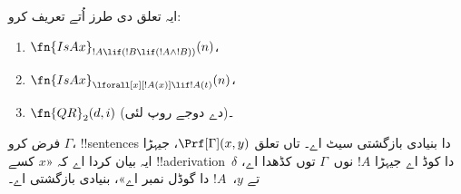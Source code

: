 \documentclass[../../../include/open-logic-section]{subfiles}
\begin{document}
\begin{prob}
ایہ تعلق
دی طرز اُتے
تعریف کرو:
\begin{enumerate}
\item $\fn{IsAx}_{!A \lif (!B \lif (!A \land !B))}(n)$،
\item $\fn{IsAx}_{\lforall[x][!A(x)] \lif !A(t)}(n)$،
\item $\fn{QR}_{2}(d, i)$
  (\QR دے دوجے روپ لئی)۔
\end{enumerate}
\end{prob}

\begin{prop}
فرض کرو $\Gamma$،
!!{sentence}s دا
بنیادی بازگشتی
سیٹ اے۔ تاں
تعلق
$\Prf[\Gamma](x, y)$،
جیہڑا ایہ بیان
کردا اے کہ
«$x$ کسے
!!a{derivation}~$\delta$
دا کوڈ اے
جیہڑا $!A$ نوں~$\Gamma$ توں کڈھدا اے، تے
$y$،~$!A$ دا
گوڈل نمبر اے»،
بنیادی بازگشتی
اے۔
\end{prop}
\end{document}
